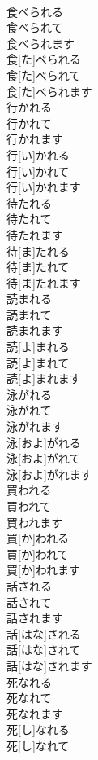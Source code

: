 \documentclass[8pt]{extreport}
\begin{document}
\begin{CJK}{UTF8}{min}
\\	食べられる 
\\	食べられて 
\\	食べられます	
\\	食[た]べられる 
\\	食[た]べられて 
\\	食[た]べられます
\\	行かれる 
\\	行かれて 
\\	行かれます	
\\	行[い]かれる 
\\	行[い]かれて 
\\	行[い]かれます
\\	待たれる 
\\	待たれて 
\\	待たれます	
\\	待[ま]たれる 
\\	待[ま]たれて 
\\	待[ま]たれます
\\	読まれる 
\\	読まれて 
\\	読まれます	
\\	読[よ]まれる 
\\	読[よ]まれて 
\\	読[よ]まれます
\\	泳がれる 
\\	泳がれて 
\\	泳がれます	
\\	泳[およ]がれる 
\\	泳[およ]がれて 
\\	泳[およ]がれます
\\	買われる 
\\	買われて 
\\	買われます	
\\	買[か]われる 
\\	買[か]われて 
\\	買[か]われます
\\	話される 
\\	話されて 
\\	話されます	
\\	話[はな]される 
\\	話[はな]されて 
\\	話[はな]されます
\\	死なれる 
\\	死なれて 
\\	死なれます	
\\	死[し]なれる 
\\	死[し]なれて 

\end{CJK}
\end{document}
